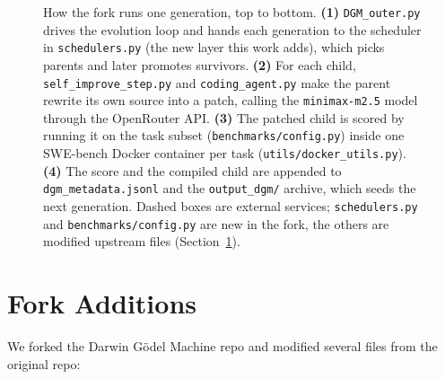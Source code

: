 \begin{figure}[tb]
{%
  }
  \caption{How the fork runs one generation, top to bottom.
    \textbf{(1)} \texttt{DGM\_outer.py} drives the evolution loop and
    hands each generation to the scheduler in \texttt{schedulers.py}
    (the new layer this work adds), which picks parents and later
    promotes survivors. \textbf{(2)} For each child,
    \texttt{self\_improve\_step.py} and \texttt{coding\_agent.py} make
    the parent rewrite its own source into a patch, calling the
    \texttt{minimax-m2.5} model through the OpenRouter API.
    \textbf{(3)} The patched child is scored by running it on the task
    subset (\texttt{benchmarks/config.py}) inside one SWE-bench Docker
    container per task (\texttt{utils/docker\_utils.py}).
    \textbf{(4)} The score and the compiled child are appended to
    \texttt{dgm\_metadata.jsonl} and the \texttt{output\_dgm/} archive,
    which seeds the next generation. Dashed boxes are external services;
    \texttt{schedulers.py} and \texttt{benchmarks/config.py} are new in
    the fork, the others are modified upstream files
    (Section~\ref{sec:fork}).}
  \label{fig:components}
\end{figure}

\section{Fork Additions}
\label{sec:fork}

We forked the Darwin G\"odel Machine repo and modified several files from
the original repo:


